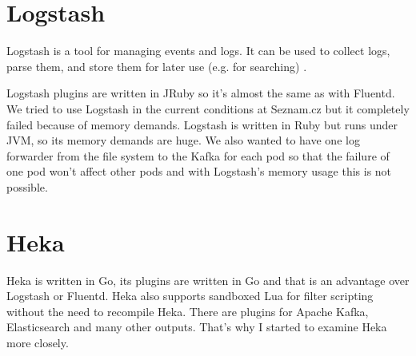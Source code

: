 \section{Logstash}
Logstash is a tool for managing events and logs. It can be used to collect logs, parse them, and store them for later use (e.g. for searching) \cite{logstash}.
 
Logstash plugins are written in JRuby so it’s almost the same as with Fluentd. We tried to use Logstash in the current conditions at Seznam.cz but it completely failed because of memory demands. Logstash is written in Ruby but runs under JVM, so its memory demands are huge. We also wanted to have one log forwarder from the file system to the Kafka for each pod so that the failure of one pod won’t affect other pods and with Logstash’s memory usage this is not possible.
    
\section{Heka}
Heka \cite{heka} is written in Go, its plugins are written in Go and that is an advantage over Logstash or Fluentd. Heka also supports sandboxed Lua for filter scripting without the need to recompile Heka. There are plugins for Apache Kafka, Elasticsearch and many other outputs. That’s why I started to examine Heka more closely.

